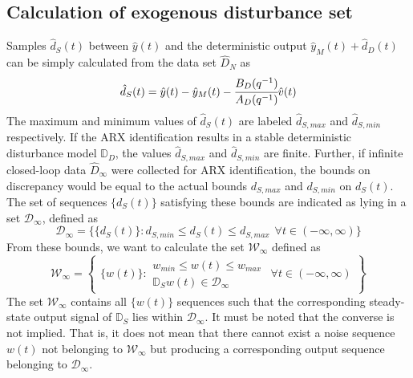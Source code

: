 \documentclass[letterpaper, 10 pt, conference]{ieeeconf}  %
\begin{document}
	\subsection{Calculation of exogenous disturbance set}
	\label{Noise}
	Samples $\hat{d}_S(t)$ between $\hat{y}(t)$ and the deterministic output $\hat{y}_M(t)+\hat{d}_D(t)$ can be simply calculated from the data set $\hat{D}_{N}$ as 
	\begin{equation*}
	\hat{d}_S(t) = \hat{y}(t)-\hat{y}_M(t)-\cfrac{B_D(q^{-1})}{A_D(q^{-1})} \hat{v}(t) 
	\end{equation*}
	The maximum and minimum values of $\hat{d}_S(t)$ are labeled $\hat{d}_{S,max}$ and $\hat{d}_{S,min}$ respectively. If the ARX identification results in a stable deterministic disturbance model $\mathbb{D}_D$, the values $\hat{d}_{S,max}$ and $\hat{d}_{S,min}$ are finite. Further, if infinite closed-loop data $\hat{D}_{\infty}$ were collected for ARX identification, the bounds on discrepancy would be equal to the actual bounds $d_{S,max}$ and $d_{S,min}$ on $d_S(t)$. The set of sequences $\{d_S(t)\}$ satisfying these bounds are indicated as lying in a set $\mathcal{D}_{\infty}$, defined as 
	\begin{equation*}
	\mathcal{D}_{\infty} = \{\{d_S(t)\}: d_{S,min} \leq d_S(t) \leq d_{S,max} \hspace{5pt} \forall t \in (-\infty,\infty) \}
	\end{equation*}
	 From these bounds, we want to calculate the set $\mathcal{W}_{\infty}$ defined as
	\begin{equation*}
	\hspace{0pt}
	\mathcal{W}_{\infty} = \begin{Bmatrix} \{w(t)\}: 
	\begin{matrix}
	w_{min}\leq w(t)\leq w_{max} \\ 
	\mathbb{D}_S w(t) \in \mathcal{D}_{\infty}
	\end{matrix} \hspace{5pt}
	\forall t \in (-\infty,\infty) 
	\end{Bmatrix}
	\end{equation*}  
	The set $\mathcal{W}_{\infty}$ contains all $\{w(t)\}$ sequences such that the corresponding steady-state output signal of $\mathbb{D}_S$ lies within $\mathcal{D}_{\infty}$. It must be noted that the converse is not implied. That is, it does not mean that there cannot exist a noise sequence $w(t)$ not belonging to $\mathcal{W}_{\infty}$ but producing a corresponding output sequence belonging to $\mathcal{D}_{\infty}$.
\end{document}
